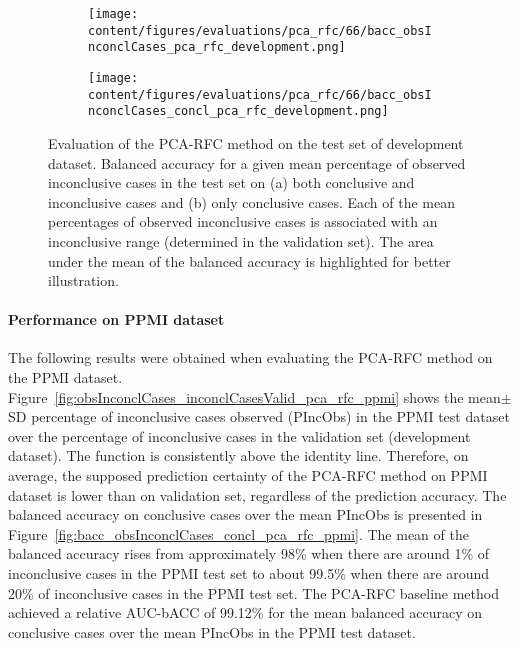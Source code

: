\begin{figure}[ht]
  \begin{subfigure}{0.5\textwidth}
    \centering
    \texttt{[image: content/figures/evaluations/pca\_rfc/66/bacc\_obsInconclCases\_pca\_rfc\_development.png]}
    \subcaption{}
    \label{fig:bacc_obsInconclCases_pca_rfc_development}
  \end{subfigure}
  \hfill
  \begin{subfigure}{0.5\textwidth}
    \centering
    \texttt{[image: content/figures/evaluations/pca\_rfc/66/bacc\_obsInconclCases\_concl\_pca\_rfc\_development.png]}
    \subcaption{}
    \label{fig:bacc_obsInconclCases_concl_pca_rfc_development}
  \end{subfigure}

  \caption{Evaluation of the PCA-RFC method on the test set of development dataset.
  Balanced accuracy for a given mean percentage of observed inconclusive cases in the test set on 
  (a) both conclusive and inconclusive cases and (b) only conclusive cases. 
  Each of the mean percentages of observed inconclusive cases is associated with an inconclusive range (determined in the validation set). 
  The area under the mean of the balanced accuracy is highlighted for better illustration.}
  \label{fig:bacc_obsInconclCases_pca_rfc_development_full}
\end{figure}




\paragraph{Performance on PPMI dataset}

The following results were obtained when evaluating the PCA-RFC method on the PPMI dataset.
Figure~\ref{fig:obsInconclCases_inconclCasesValid_pca_rfc_ppmi} shows the
mean$\pm$SD percentage of inconclusive cases observed (PIncObs) in the PPMI test dataset 
over the percentage of inconclusive cases in the validation set (development dataset).
The function is consistently above the identity line.
Therefore, on average, the supposed prediction certainty of the PCA-RFC method on PPMI dataset is lower than on validation set,
regardless of the prediction accuracy.
The balanced accuracy on conclusive cases over the mean PIncObs is presented 
in Figure~\ref{fig:bacc_obsInconclCases_concl_pca_rfc_ppmi}.
The mean of the balanced accuracy rises from approximately 98\% 
when there are around 1\% of inconclusive cases in the PPMI test set to about 99.5\% 
when there are around 20\% of inconclusive cases in the PPMI test set.
The PCA-RFC baseline method achieved a relative AUC-bACC of 99.12\% for the mean balanced accuracy on conclusive cases 
over the mean PIncObs in the PPMI test dataset.

